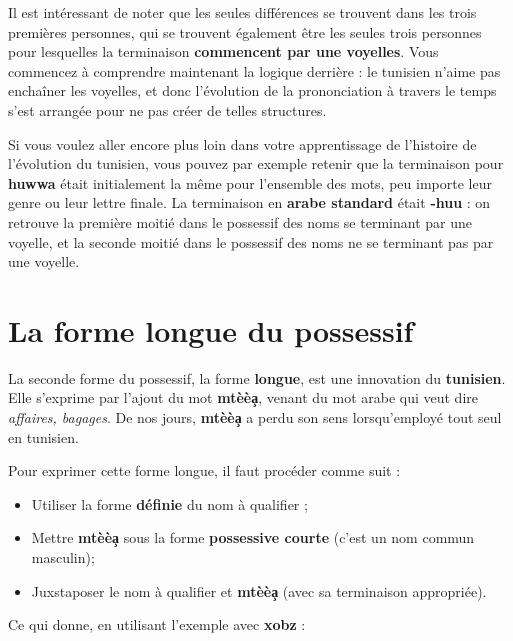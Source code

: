 Il est intéressant de noter que les seules différences se trouvent dans les trois premières personnes, qui se trouvent également être les seules trois personnes pour lesquelles la terminaison \textbf{commencent par une voyelles}. Vous commencez à comprendre maintenant la logique derrière : le tunisien n'aime pas enchaîner les voyelles, et donc l'évolution de la prononciation à travers le temps s'est arrangée pour ne pas créer de telles structures. 

Si vous voulez aller encore plus loin dans votre apprentissage de l'histoire de l'évolution du tunisien, vous pouvez par exemple retenir que la terminaison pour \textbf{huwwa} était initialement la même pour l'ensemble des mots, peu importe leur genre ou leur lettre finale. La terminaison en \textbf{arabe standard} était \textbf{-huu} : on retrouve la première moitié dans le possessif des noms se terminant par une voyelle, et la seconde moitié dans le possessif des noms ne se terminant pas par une voyelle.

\section{La forme longue du possessif}
La seconde forme du possessif, la forme \textbf{longue}, est une innovation du \textbf{tunisien}. Elle s'exprime par l'ajout du mot \textbf{mtèè\c{a}}, venant du mot arabe  qui veut dire \textit{affaires, bagages}. De nos jours, \textbf{mtèè\c{a}} a perdu son sens lorsqu'employé tout seul en tunisien.

Pour exprimer cette forme longue, il faut procéder comme suit : 
\begin{itemize}
    \item Utiliser la forme \textbf{définie} du nom à qualifier ;
    \item Mettre \textbf{mtèè\c{a}} sous la forme \textbf{possessive courte} (c'est un nom commun masculin);
    \item Juxstaposer le nom à qualifier et \textbf{mtèè\c{a}} (avec sa terminaison appropriée).
\end{itemize}

Ce qui donne, en utilisant l'exemple avec \textbf{xobz} : 

